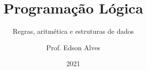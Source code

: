\title{Programação Lógica}
\subtitle{Regras, aritmética e estruturas de dados}
\date{2021}
\author{Prof. Edson Alves}
